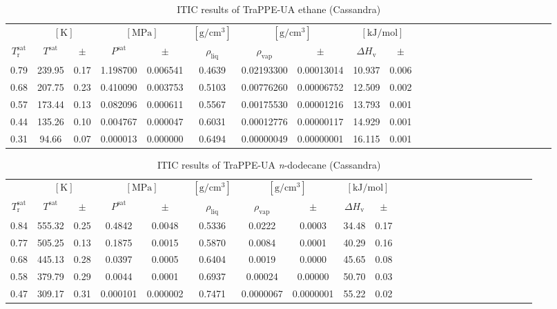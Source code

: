 \documentclass[%
 aip,
 jcp,
 sd,%
 amsmath,amssymb,
]{revtex4-1}
\begin{document}
\begin{table*}[]
\centering
\caption{
ITIC results of TraPPE-UA ethane (Cassandra)
}
\label{tab:TraPPE-C2-trappe}
\begin{ruledtabular}
\begin{tabular}{cccccccccccccccccccccccc}
 & \multicolumn{2}{c}{$[\mathrm{K}]$} &	 \multicolumn{2}{c}{$[\mathrm{MPa}]$} & $[\mathrm{g/cm^3}]$ & \multicolumn{2}{c}{$[\mathrm{g/cm^3}]$} & \multicolumn{2}{c}{$[\mathrm{kJ/mol}]$} \\
$T_\mathrm{r}^{\mathrm{sat}}$ & $T^{\mathrm{sat}}$ & $\pm$ & $P^{\mathrm{sat}}$ & $\pm$ & $\rho_{\mathrm{liq}}$ & $\rho_{\mathrm{vap}}$ & $\pm$ & $\Delta H_{\mathrm{v}}$ & $\pm$
 \\
\hline		
0.79	&	239.95	&	0.17	&	1.198700	&	0.006541	&	0.4639	&	0.02193300	&	0.00013014	&	10.937	&	0.006	\\
0.68	&	207.75	&	0.23	&	0.410090	&	0.003753	&	0.5103	&	0.00776260	&	0.00006752	&	12.509	&	0.002	\\
0.57	&	173.44	&	0.13	&	0.082096	&	0.000611	&	0.5567	&	0.00175530	&	0.00001216	&	13.793	&	0.001	\\
0.44	&	135.26	&	0.10	&	0.004767	&	0.000047	&	0.6031	&	0.00012776	&	0.00000117	&	14.929	&	0.001	\\
0.31	&	94.66	&	0.07	&	0.000013	&	0.000000	&	0.6494	&	0.00000049	&	0.00000001	&	16.115	&	0.001	\\
\end{tabular}
\end{ruledtabular}
\end{table*}


\begin{table*}[]
\centering
\caption{
ITIC results of TraPPE-UA \textit{n}-dodecane (Cassandra)
}
\label{tab:TraPPE-C12-trappe}
\begin{ruledtabular}
\begin{tabular}{cccccccccccccccccccccccc}
 & \multicolumn{2}{c}{$[\mathrm{K}]$} &	 \multicolumn{2}{c}{$[\mathrm{MPa}]$} & $[\mathrm{g/cm^3}]$ & \multicolumn{2}{c}{$[\mathrm{g/cm^3}]$} & \multicolumn{2}{c}{$[\mathrm{kJ/mol}]$} \\
$T_\mathrm{r}^{\mathrm{sat}}$ & $T^{\mathrm{sat}}$ & $\pm$ & $P^{\mathrm{sat}}$ & $\pm$ & $\rho_{\mathrm{liq}}$ & $\rho_{\mathrm{vap}}$ & $\pm$ & $\Delta H_{\mathrm{v}}$ & $\pm$
 \\
\hline		
0.84	&	555.32	&	0.25	&	0.4842	&	0.0048	&	0.5336	&	0.0222	&	0.0003	&	34.48	&	0.17	\\
0.77	&	505.25	&	0.13	&	0.1875	&	0.0015	&	0.5870	&	0.0084	&	0.0001	&	40.29	&	0.16	\\
0.68	&	445.13	&	0.28	&	0.0397	&	0.0005	&	0.6404	&	0.0019	&	0.0000	&	45.65	&	0.08	\\
0.58	&	379.79	&	0.29	&	0.0044	&	0.0001	&	0.6937	&	0.00024	&	0.00000	&	50.70	&	0.03	\\
0.47	&	309.17	&	0.31	&	0.000101	&	0.000002	&	0.7471	&	0.0000067	&	0.0000001	&	55.22	&	0.02	\\
\end{tabular}
\end{ruledtabular}
\end{table*}
\end{document}
